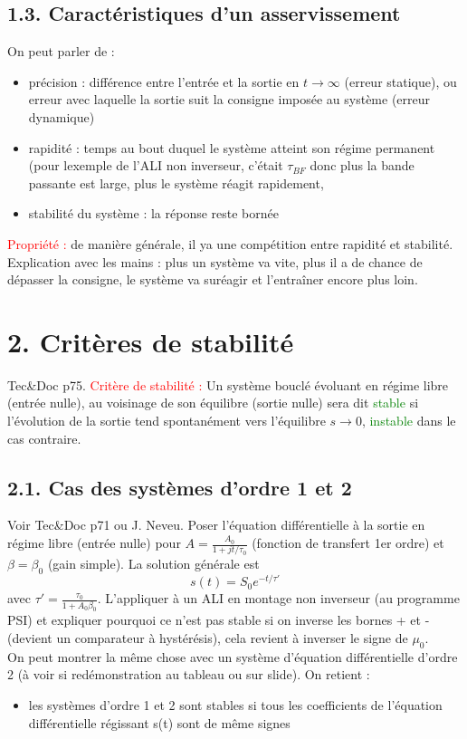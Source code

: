 \documentclass[french, a4paper, 10pt, twocolumn, landscape]{article}
\begin{document}
\subsection*{1.3. Caractéristiques d'un asservissement}

On peut parler de :
\begin{itemize}
    \item précision : différence entre l'entrée et la sortie en $t\rightarrow\infty$ (erreur statique), ou erreur avec laquelle la sortie suit la consigne imposée au système (erreur dynamique)
    \item rapidité : temps au bout duquel le système atteint son régime permanent (pour lexemple de l'ALI non inverseur, c'était $\tau_{BF}$ donc plus la bande passante est large, plus le système réagit rapidement,
    \item stabilité du système : la réponse reste bornée
\end{itemize}
\textcolor{red}{Propriété :} de manière générale, il ya une compétition entre rapidité et stabilité. Explication avec les mains : plus un système va vite, plus il a de chance de dépasser la consigne, le système va suréagir et l'entraîner encore plus loin.

\section*{2. Critères de stabilité}

Tec\&Doc p75. \textcolor{red}{Critère de stabilité :} Un système bouclé évoluant en régime libre (entrée nulle), au voisinage de son équilibre (sortie nulle) sera dit \textcolor{green}{stable} si l'évolution de la sortie tend spontanément vers l'équilibre $s\rightarrow0$, \textcolor{green}{instable} dans le cas contraire.
\subsection*{2.1. Cas des systèmes d'ordre 1 et 2}
Voir Tec\&Doc p71 ou J. Neveu. Poser l'équation différentielle à la sortie en régime libre (entrée nulle) pour $A=\frac{A_0}{1+jt/\tau_0}$  (fonction de transfert 1er ordre) et $\beta=\beta_0$ (gain simple). La solution générale est 
\begin{equation}
    s(t) = S_0e^{-t/\tau'}
\end{equation}
avec $\tau'=\frac{\tau_0}{1+A_0\beta_0}$. L'appliquer à un ALI en montage non inverseur (au programme PSI) et expliquer pourquoi ce n'est pas stable si on inverse les bornes + et - (devient un comparateur à hystérésis), cela revient à inverser le signe de $\mu_0$.\\
On peut montrer la même chose avec un système d'équation différentielle d'ordre 2 (à voir si redémonstration au tableau ou sur slide). On retient :
\begin{itemize}
    \item les systèmes d'ordre 1 et 2 sont stables si tous les coefficients de l'équation différentielle régissant s(t) sont de même signes
\end{itemize}
\end{document}
